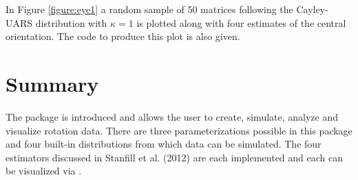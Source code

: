In Figure \ref{figure:eye1} a random sample of 50 matrices following the Cayley-UARS distribution with $\kappa=1$ is plotted along with four estimates of the central orientation.  The code to produce this plot is also given.

\section{Summary}

The  package is introduced and allows the user to create, simulate, analyze and visualize rotation data.  There are three parameterizations possible in this package and four built-in distributions from which data can be simulated.  The four estimators discussed in Stanfill et al. (2012) are each implemented and each can be visualized via .

%


\address{Bryan Stanfill\\
  Department of Statistics\\
  Iowa State University\\
  Ames, IA 50011}\\

\address{Heike Hofmann\\
  Department of Statistics\\
  Iowa State University\\
  Ames, IA 50011}\\

\address{Ulrike Genschel\\
  Department of Statistics\\
  Iowa State University\\
  Ames, IA 50011}\\
